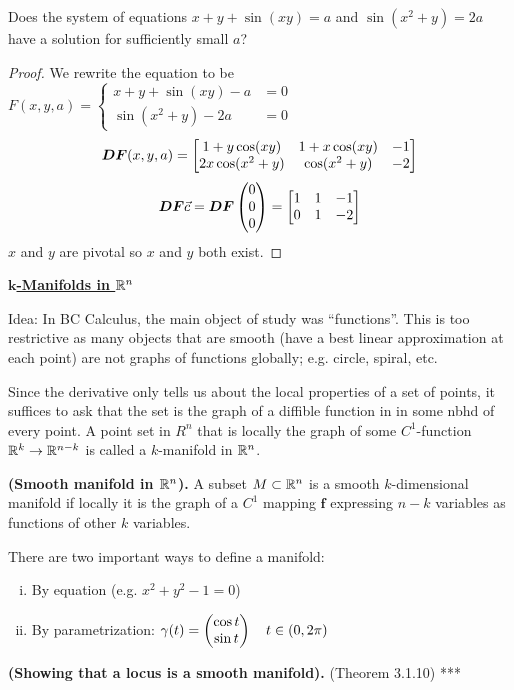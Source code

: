 
Does the system of equations $x+y+\sin (xy)=a$ and $\sin (x^2+y)=2a$ have a solution for sufficiently small $a$?


\begin{proof}
  We rewrite the equation to be $F(x,y,a)=\begin{cases}
    x+y+\sin(xy)-a &= 0 \\
    \sin(x^2+y)-2a &= 0
  \end{cases}$
  \[\bm{DF}(x,y,a) = \begin{bmatrix} 1 + y\cos(xy) & 1 + x\cos(xy) & -1 \\ 2x\cos(x^2+y) & \cos(x^2+y) & -2 \end{bmatrix}\]
  \[\bm{DF}\vec{c} = \bm{DF}\begin{pmatrix} 0 \\ 0 \\ 0 \end{pmatrix} = \begin{bmatrix} 1 & 1 & -1 \\ 0 & 1 & -2 \end{bmatrix}\]
  $x$ and $y$ are pivotal so $x$ and $y$ both exist.
\end{proof}
\vspace{24pt}

\ul{\textbf{$\bm{k}$-Manifolds in $\mathbb{R}^n$}}

Idea: In BC Calculus, the main object of study was ``functions''. This is too restrictive as many objects that are smooth (have a best linear approximation at each point) are not graphs of functions globally; e.g. circle, spiral, etc.

Since the derivative only tells us about the local properties of a set of points, it suffices to ask that the set is the graph of a diffible function in in some nbhd of every point. A point set in $R^n$ that is locally the graph of some $C^1$-function $\mathbb{R}^k\to \mathbb{R}^{n-k}$ is called a $k$-manifold in $\mathbb{R}^n$.

\begin{defn}
  \textbf{(Smooth manifold in $\mathbb{R}^n$).} A subset $M\subset \mathbb{R}^n$ is a smooth $k$-dimensional manifold if locally it is the graph of a $C^1$ mapping $\bm{f}$ expressing $n-k$ variables as functions of other $k$ variables.
\end{defn}

There are two important ways to define a manifold:
\begin{enumerate}[(i)]
  \item By equation (e.g. $x^2 + y^2 -1 = 0$)
  \item By parametrization: $\displaystyle \gamma (t)=\begin{pmatrix} \cos t \\ \sin t \end{pmatrix}\quad t\in (0,2\pi)$
\end{enumerate}

\begin{theorem}
  \textbf{(Showing that a locus is a smooth manifold).} (Theorem 3.1.10) ***
\end{theorem}
